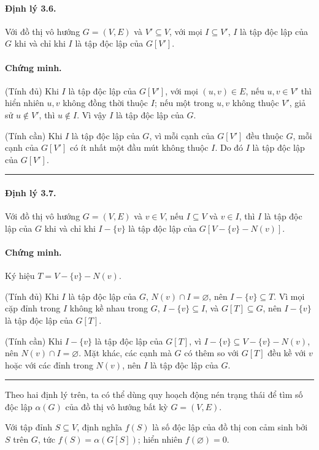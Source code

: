 \documentclass[11pt]{article}
\newcommand{\qedmark}{\hfill\rule{0.7ex}{0.7ex}}
\begin{document}
\paragraph{Định lý 3.6.}
Với đồ thị vô hướng \(G=(V,E)\) và \(V'\subseteq V\), với mọi \(I\subseteq V'\),
\(I\) là tập độc lập của \(G\) khi và chỉ khi \(I\) là tập độc lập của
\(G[V']\).

\paragraph{Chứng minh.}
(Tính đủ) Khi \(I\) là tập độc lập của \(G[V']\), với mọi \((u,v)\in E\), nếu
\(u,v\in V'\) thì hiển nhiên \(u,v\) không đồng thời thuộc \(I\); nếu một trong
\(u,v\) không thuộc \(V'\), giả sử \(u\notin V'\), thì \(u\notin I\). Vì vậy
\(I\) là tập độc lập của \(G\).

(Tính cần) Khi \(I\) là tập độc lập của \(G\), vì mỗi cạnh của \(G[V']\) đều
thuộc \(G\), mỗi cạnh của \(G[V']\) có ít nhất một đầu mút không thuộc \(I\).
Do đó \(I\) là tập độc lập của \(G[V']\). \qedmark

\paragraph{Định lý 3.7.}
Với đồ thị vô hướng \(G=(V,E)\) và \(v\in V\), nếu \(I\subseteq V\) và
\(v\in I\), thì \(I\) là tập độc lập của \(G\) khi và chỉ khi \(I-\{v\}\) là
tập độc lập của \(G[V-\{v\}-N(v)]\).

\paragraph{Chứng minh.}
Ký hiệu \(T=V-\{v\}-N(v)\).

(Tính đủ) Khi \(I\) là tập độc lập của \(G\), \(N(v)\cap I=\varnothing\), nên
\(I-\{v\}\subseteq T\). Vì mọi cặp đỉnh trong \(I\) không kề nhau trong \(G\),
\(I-\{v\}\subseteq I\), và \(G[T]\subseteq G\), nên \(I-\{v\}\) là tập độc lập
của \(G[T]\).

(Tính cần) Khi \(I-\{v\}\) là tập độc lập của \(G[T]\), vì
\(I-\{v\}\subseteq V-\{v\}-N(v)\), nên \(N(v)\cap I=\varnothing\). Mặt khác,
các cạnh mà \(G\) có thêm so với \(G[T]\) đều kề với \(v\) hoặc với các đỉnh
trong \(N(v)\), nên \(I\) là tập độc lập của \(G\). \qedmark

Theo hai định lý trên, ta có thể dùng quy hoạch động nén trạng thái để tìm số
độc lập \(\alpha(G)\) của đồ thị vô hướng bất kỳ \(G=(V,E)\).

Với tập đỉnh \(S\subseteq V\), định nghĩa \(f(S)\) là số độc lập của đồ thị con
cảm sinh bởi \(S\) trên \(G\), tức \(f(S)=\alpha(G[S])\); hiển nhiên
\(f(\varnothing)=0\).
\end{document}
